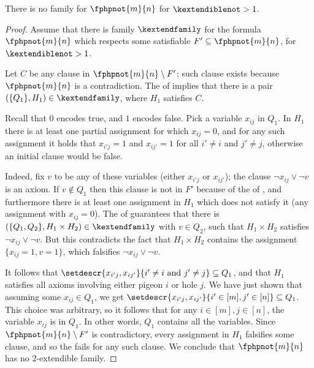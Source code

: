 \begin{theorem}
  There is no \kextendible family for $\fphpnot{m}{n}$ for $\kextendiblenot > 1$.
\end{theorem}
\begin{proof}

  Assume that there is \akextendible family $\kextendfamily$ for
  the formula $\fphpnot{m}{n}$ which respects some satisfiable
  $F'\subseteq \fphpnot{m}{n}$, for $\kextendiblenot>1$.

  Let $C$ be any clause in $\fphpnot{m}{n}\setminus F'$; such clause exists because $\fphpnot{m}{n}$ is a contradiction.
  The \extensionproperty of \kextendfamily implies that there is a
  pair $(\{Q_{1}\}, H_{1} )\in\kextendfamily$, where $H_{1}$ satisfies $C$.

  Recall that $0$ encodes true, and $1$ encodes false. Pick a
  variable $x_{ij}$ in $Q_{1}$. In $H_{1}$ there is at least one
  partial assignment for which $x_{ij}=0$, and for any such assignment
  it holds that $x_{i'j}=1$ and $x_{ij'}=1$ for all $i'\not=i$ and
  $j'\not=j$, otherwise an initial clause would be false.

  Indeed, fix $v$ to be any of these variables (either $x_{i'j}$ or
  $x_{ij'}$); the clause $\lnot{x_{ij}} \lor \lnot{v}$ is an axiom.
  If $v \not\in Q_{1}$ then this clause is not in $F'$ because of the
  \respectfulness of \kextendfamily, and furthermore there is at
  least one assignment in $H_{1}$ which does not satisfy it (\ieComma any assignment with
  $x_{ij}=0$).
  The \extensionproperty of \kextendfamily guarantees that there is
  $(\{Q_{1},Q_{2}\},H_{1}\times H_{2}) \in \kextendfamily$ with $v\in
  Q_{2}$, such that $H_{1}\times H_{2}$ satisfies $\lnot{x_{ij}} \lor
  \lnot{v}$. But this contradicts the fact that $H_{1}\times H_{2}$
  contains the assignment $\{x_{ij}=1,v=1\}$, which falsifies
  $\lnot{x_{ij}} \lor \lnot{v}$.


  It follows that $\setdescr{x_{i'j},x_{ij'}}{i'\not=i \text{\ and\
    } j'\not=j} \subseteq Q_{1}$, and that $H_{1}$ satisfies all
  axioms involving either pigeon $i$ or hole $j$.
  We have just shown that assuming some $x_{ij}\in Q_{1}$, we get
  \mbox{$\setdescr{x_{i'j},x_{ij'}}{i'\in[m], j'\in[n]}\subseteq
    Q_{1}$}. This choice was arbitrary, so it follows that for any
  $i\in[m], j\in[n]$, the variable $x_{ij}$ is in $Q_{1}$. In other
  words, $Q_1$ contains all the variables. Since
  $\fphpnot{m}{n}\setminus F'$ is contradictory, every assignment in
  $H_1$ falsifies some clause, and so the \extensionproperty fails for
  any such clause.  We conclude that $\fphpnot{m}{n}$ has no
  $2$-extendible family.
  \end{proof}

